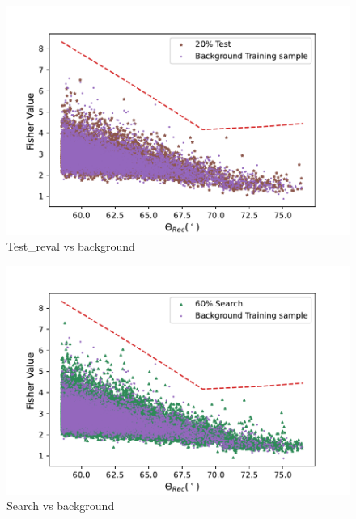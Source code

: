\begin{figure}[t!]
  \centering
  \includegraphics[width=14.5cm]{thesis_figures/Nu_analysis/Fisher_plots/Fisher_comp_bkg_test_wnt.pdf}
  \caption{Test_reval vs background}
  \label{fig:Fish_bkg_test}
\end{figure}

\begin{figure}[t!]
  \centering
  \includegraphics[width=14.5cm]{thesis_figures/Nu_analysis/Fisher_plots/Fisher_comp_bkg_search_wnt.pdf}
  \caption{Search vs background}
  \label{fig:Fish_bkg_test}
\end{figure}

